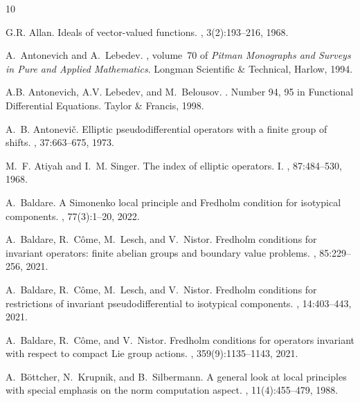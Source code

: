 \documentclass[11pt,a4paper]{amsart}
\newcommand\<{\langle}
\renewcommand\>{\rangle}
\theoremstyle{definition}
\begin{document}
%
\begin{thebibliography}{10}

G.R. Allan.
\newblock Ideals of vector-valued functions.
, 3(2):193--216,
  1968.

A.~Antonevich and A.~Lebedev.
,
  volume~70 of {\em Pitman Monographs and Surveys in Pure and Applied
  Mathematics}.
\newblock Longman Scientific \& Technical, Harlow, 1994.

A.B. Antonevich, A.V. Lebedev, and M.~Belousov.
.
\newblock Number 94, 95 in Functional Differential Equations. Taylor \&
  Francis, 1998.

A.~B. Antonevi\v{c}.
\newblock Elliptic pseudodifferential operators with a finite group of shifts.
, 37:663--675, 1973.

M.~F. Atiyah and I.~M. Singer.
\newblock The index of elliptic operators. {I}.
, 87:484--530, 1968.

A.~Baldare.
\newblock A {S}imonenko local principle and {F}redholm condition for isotypical
  components.
, 77(3):1--20, 2022.

A.~Baldare, R.~C\^{o}me, M.~Lesch, and V.~Nistor.
\newblock Fredholm conditions for invariant operators: finite abelian groups
  and boundary value problems.
, 85:229--256, 2021.

A.~Baldare, R.~C\^{o}me, M.~Lesch, and V.~Nistor.
\newblock Fredholm conditions for restrictions of invariant pseudodifferential
  to isotypical components.
, 14:403--443, 2021.

A.~Baldare, R.~C{\^o}me, and V.~Nistor.
\newblock Fredholm conditions for operators invariant with respect to compact
  {Lie} group actions.
, 359(9):1135--1143, 2021.

A.~B{\"o}ttcher, N.~Krupnik, and B.~Silbermann.
\newblock A general look at local principles with special emphasis on the norm
  computation aspect.
, 11(4):455--479, 1988.


\end{thebibliography}
\end{document}
